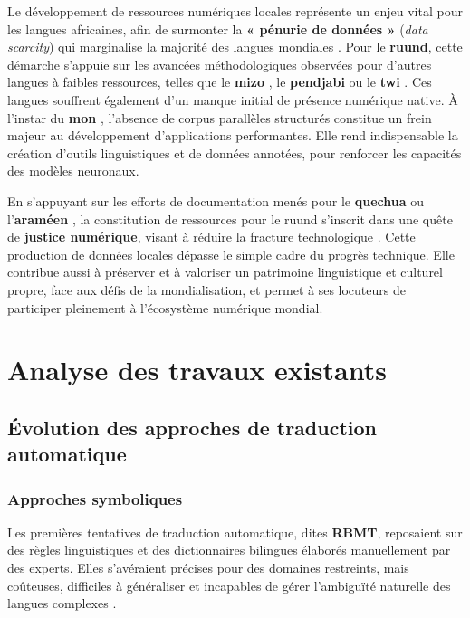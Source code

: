 Le développement de ressources numériques locales représente un enjeu vital pour les langues africaines, afin de surmonter la \textbf{« pénurie de données »} (\textit{data scarcity}) qui marginalise la majorité des langues mondiales \cite{ranathunga2023neural}. Pour le \textbf{ruund}, cette démarche s'appuie sur les avancées méthodologiques observées pour d'autres langues à faibles ressources, telles que le \textbf{mizo} \cite{haulai2023construction, lalrempuii2021improved}, le \textbf{pendjabi} \cite{jindal2017building} ou le \textbf{twi} \cite{agyei2024low}. Ces langues souffrent également d'un manque initial de présence numérique native. À l'instar du \textbf{mon} \cite{tun2025exploring}, l'absence de corpus parallèles structurés constitue un frein majeur au développement d'applications performantes. Elle rend indispensable la création d'outils linguistiques et de données annotées, pour renforcer les capacités des modèles neuronaux.

En s'appuyant sur les efforts de documentation menés pour le \textbf{quechua} \cite{sullatores2024desarrollo} ou l'\textbf{araméen} \cite{liebeskind2024machine}, la constitution de ressources pour le ruund s'inscrit dans une quête de \textbf{justice numérique}, visant à réduire la fracture technologique \cite{ranathunga2023neural, agyei2024low}. Cette production de données locales dépasse le simple cadre du progrès technique. Elle contribue aussi à préserver et à valoriser un patrimoine linguistique et culturel propre, face aux défis de la mondialisation, et permet à ses locuteurs de participer pleinement à l'écosystème numérique mondial.


\section{Analyse des travaux existants}




\subsection{Évolution des approches de traduction automatique}

\subsubsection{Approches symboliques}

Les premières tentatives de traduction automatique, dites \textbf{\ac{RBMT}}, reposaient sur des règles linguistiques et des dictionnaires bilingues élaborés manuellement par des experts. Elles s'avéraient précises pour des domaines restreints, mais coûteuses, difficiles à généraliser et incapables de gérer l'ambiguïté naturelle des langues complexes \cite{ranathunga2023neural, gangar2021hindi}.

